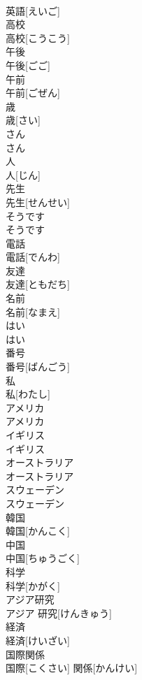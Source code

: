 \documentclass[8pt]{extreport}
\begin{document}
\begin{CJK}{UTF8}{min}
\\	英語[えいご]		
\\	高校	
\\	高校[こうこう]		
\\	午後	
\\	午後[ごご]		
\\	午前	
\\	午前[ごぜん]		
\\	歳	
\\	歳[さい]		
\\	さん	
\\	さん		
\\	人	
\\	人[じん]		
\\	先生	
\\	先生[せんせい]		
\\	そうです	
\\	そうです		
\\	電話	
\\	電話[でんわ]		
\\	友達	
\\	友達[ともだち]		
\\	名前	
\\	名前[なまえ]		
\\	はい	
\\	はい		
\\	番号	
\\	番号[ばんごう]		
\\	私	
\\	私[わたし]		
\\	アメリカ	
\\	アメリカ		
\\	イギリス	
\\	イギリス		
\\	オーストラリア	
\\	オーストラリア		
\\	スウェーデン	
\\	スウェーデン		
\\	韓国	
\\	韓国[かんこく]		
\\	中国	
\\	中国[ちゅうごく]		
\\	科学	
\\	科学[かがく]		
\\	アジア研究	
\\	アジア 研究[けんきゅう]		
\\	経済	
\\	経済[けいざい]		
\\	国際関係	
\\	国際[こくさい] 関係[かんけい]		

\end{CJK}
\end{document}
